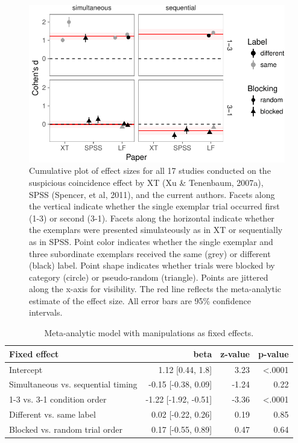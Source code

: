 \documentclass[english,floatsintext,man]{apa6}
\newcounter{author}
\theoremstyle{definition}
\theoremstyle{definition}
\theoremstyle{remark}
\begin{document}
\begin{figure}
\centering
\includegraphics{xtmem_files/figure-latex/unnamed-chunk-4-1.pdf}
\caption{\label{fig:unnamed-chunk-4}Cumulative plot of effect sizes for all
17 studies conducted on the suspicious coincidence effect by XT (Xu \&
Tenenbaum, 2007a), SPSS (Spencer, et al, 2011), and the current authors.
Facets along the vertical indicate whether the single exemplar trial
occurred first (1-3) or second (3-1). Facets along the horizontal
indicate whether the exemplars were presented simulateously as in XT or
sequentially as in SPSS. Point color indicates whether the single
exemplar and three subordinate exemplars received the same (grey) or
different (black) label. Point shape indicates whether trials were
blocked by category (circle) or pseudo-random (triangle). Points are
jittered along the x-axis for visibility. The red line reflects the
meta-analytic estimate of the effect size. All error bars are 95\%
confidence intervals.}
\end{figure}

\begin{table}

\caption{\label{tab:unnamed-chunk-5}Meta-analytic model with manipulations as fixed effects.}
\centering
\fontsize{12}{14}\selectfont
\begin{tabular}[t]{lrrr}
\toprule
Fixed effect & beta & z-value & p-value\\
\midrule
Intercept & 1.12 [0.44, 1.8] & 3.23 & <.0001\\
Simultaneous vs. sequential timing & -0.15 [-0.38, 0.09] & -1.24 & 0.22\\
1-3 vs. 3-1 condition order & -1.22 [-1.92, -0.51] & -3.36 & <.0001\\
Different vs. same label & 0.02 [-0.22, 0.26] & 0.19 & 0.85\\
Blocked vs. random trial order & 0.17 [-0.55, 0.89] & 0.47 & 0.64\\
\bottomrule
\end{tabular}
\end{table}
\end{document}
